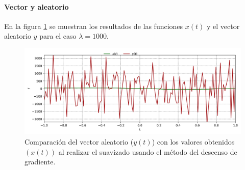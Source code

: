 \paragraph{Vector y aleatorio}

En la figura \ref{fig:lambda_1000} se muestran los resultados de las funciones $x(t)$ y el vector aleatorio $y$ para el caso $\lambda=1000$.

\begin{figure}[H]
    \centering
    \includegraphics[width=17cm]{Graphics/Problema_3/lambda_1000.png}
    \caption{Comparación del vector aleatorio ($y(t)$) con los valores obtenidos $(x(t))$ al realizar el suavizado usando el método del descenso de gradiente.}
    \label{fig:lambda_1000}
\end{figure}